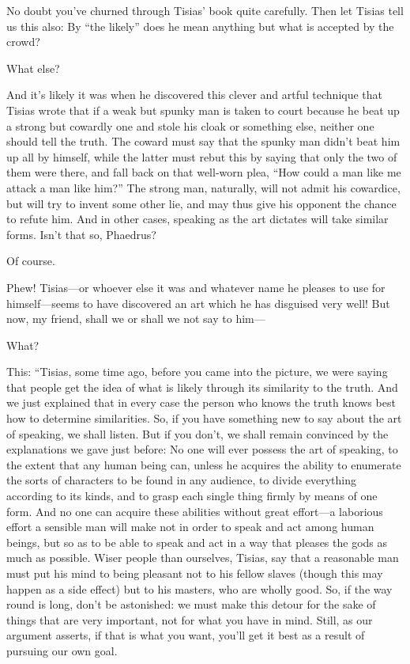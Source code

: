 \saysocrates No doubt you've churned through Tisias' book quite carefully.
Then let Tisias tell us this also: By “the likely” does he mean anything
but what is accepted by the crowd?

\sayphaedrus What else?

\saysocrates And it's likely it was when he discovered this clever and
artful technique that Tisias wrote that if a weak but spunky man is
taken to court because he beat up a strong but cowardly one and stole
his cloak or something else, neither one should tell the truth. The
coward must say that the spunky man didn't beat him up all by himself,
while the latter must rebut this by saying that only the two of
them were there, and fall back on that well-worn plea, “How could a man
like me attack a man like him?” The strong man, naturally, will not
admit his cowardice, but will try to invent some other lie, and may thus
give his opponent the chance to refute him. And in other cases, speaking
as the art dictates will take similar forms. Isn't that so, Phaedrus?

\sayphaedrus Of course.

\saysocrates Phew! Tisias---or whoever else it was and whatever name he
pleases to use for
himself---seems
to have discovered an art which he has disguised very well! But now, my
friend, shall we or shall we not say to him---

\sayphaedrus What?

\saysocrates This: “Tisias, some time ago, before you came into the
picture, we were saying that people get the idea of what is likely
through its similarity to the truth. And we just explained that in every
case the person who knows the truth knows best how to determine
similarities. So, if you have something new to say about the art of
speaking, we shall listen. But if you don't, we shall remain convinced
by the explanations we gave just before: No one will ever possess the
art of speaking, to the extent that any human being can, unless
he acquires the ability to enumerate the sorts of characters to be found
in any audience, to divide everything according to its kinds, and to
grasp each single thing firmly by means of one form. And no one can
acquire these abilities without great effort---a laborious effort a
sensible man will make not in order to speak and act among human beings,
but so as to be able to speak and act in a way that pleases the gods as
much as possible. Wiser people than ourselves, Tisias, say that a
reasonable man must put his mind to being pleasant not to his fellow 
slaves (though this may happen as a side effect) but to
his masters, who are wholly good. So, if the way round is long, don't be
astonished: we must make this detour for the sake of things that are
very important, not for what you have in mind. Still, as our argument
asserts, if that is what you want, you'll get it best as a result of
pursuing our own goal.

